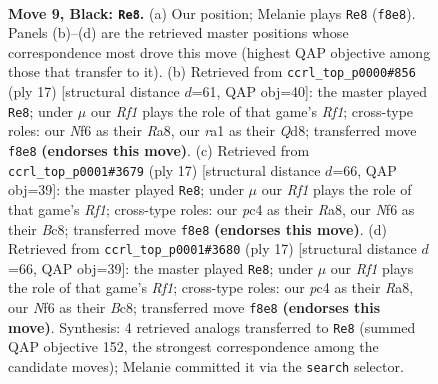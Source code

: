 \documentclass[11pt]{article}
\begin{document}
\clearpage

\begin{figure}[p]\centering
\begin{subfigure}{0.46\textwidth}\centering
\resizebox{\linewidth}{!}{%
\newchessgame
\chessboard[
  setfen={r1b2rk1/ppppqpp1/2n1pn1p/8/P1PP3P/2P2NP1/3BPP2/R2QKB1R b KQ - 0 9},
  showmover=false,
  pgfstyle=straightmove, color=movearrow, markmove={f8-e8}
]}
\caption{}
\end{subfigure}\hfill
\begin{subfigure}{0.46\textwidth}\centering
\resizebox{\linewidth}{!}{%
\newchessgame
\chessboard[
  setfen={r1bq1rk1/1pp2ppp/2nppn2/p7/2PP4/PPQ2N2/1B2PPPP/R3KB1R b KQ - 2 9},
  showmover=false,
  pgfstyle=straightmove, color=movearrow, markmove={f8-e8}
]}
\caption{}
\end{subfigure}
\\[4pt]
\begin{subfigure}{0.46\textwidth}\centering
\resizebox{\linewidth}{!}{%
\newchessgame
\chessboard[
  setfen={r1bq1rk1/ppp2pp1/2np1n1p/4p3/4P3/P1PP1NP1/2P2PBP/R1BQ1RK1 b - - 0 9},
  showmover=false,
  pgfstyle=straightmove, color=movearrow, markmove={f8-e8}
]}
\caption{}
\end{subfigure}\hfill
\begin{subfigure}{0.46\textwidth}\centering
\resizebox{\linewidth}{!}{%
\newchessgame
\chessboard[
  setfen={r1bq1rk1/ppp2pp1/2np1n1p/4p3/4P3/P1PP1NP1/2P2PBP/R1BQ1RK1 b - - 0 9},
  showmover=false,
  pgfstyle=straightmove, color=movearrow, markmove={f8-e8}
]}
\caption{}
\end{subfigure}
\caption{\textbf{Move 9, Black: \texttt{Re8}.} (a) Our position; Melanie plays \texttt{Re8} (\texttt{f8e8}). Panels (b)--(d) are the retrieved master positions whose correspondence most drove this move (highest QAP objective among those that transfer to it). (b) Retrieved from \texttt{ccrl\_top\_p0000\#856} (ply 17) [structural distance $d$=61, QAP obj=40]: the master played \texttt{Re8}; under $\mu$ our \emph{Rf1} plays the role of that game's \emph{Rf1}; cross-type roles: our \emph{N}f6 as their \emph{R}a8, our \emph{r}a1 as their \emph{Q}d8; transferred move \texttt{f8e8} \textbf{(endorses this move)}. (c) Retrieved from \texttt{ccrl\_top\_p0001\#3679} (ply 17) [structural distance $d$=66, QAP obj=39]: the master played \texttt{Re8}; under $\mu$ our \emph{Rf1} plays the role of that game's \emph{Rf1}; cross-type roles: our \emph{p}c4 as their \emph{R}a8, our \emph{N}f6 as their \emph{B}c8; transferred move \texttt{f8e8} \textbf{(endorses this move)}. (d) Retrieved from \texttt{ccrl\_top\_p0001\#3680} (ply 17) [structural distance $d$=66, QAP obj=39]: the master played \texttt{Re8}; under $\mu$ our \emph{Rf1} plays the role of that game's \emph{Rf1}; cross-type roles: our \emph{p}c4 as their \emph{R}a8, our \emph{N}f6 as their \emph{B}c8; transferred move \texttt{f8e8} \textbf{(endorses this move)}. Synthesis: 4 retrieved analogs transferred to \texttt{Re8} (summed QAP objective 152, the strongest correspondence among the candidate moves); Melanie committed it via the \texttt{search} selector.}
\label{fig:thought-m17}
\end{figure}
\end{document}
